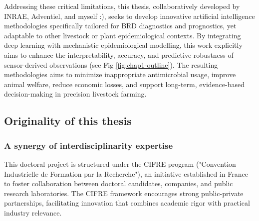 Addressing these critical limitations, this thesis, collaboratively developed by INRAE, Adventiel, and myself :), seeks to develop innovative artificial intelligence methodologies specifically tailored for BRD diagnostics and prognostics, yet adaptable to other livestock or plant epidemiological contexts. By integrating deep learning with mechanistic epidemiological modelling, this work explicitly aims to enhance the interpretability, accuracy, and predictive robustness of sensor-derived observations (see Fig \ref{fig:chap1-outline}). The resulting methodologies aims to minimize inappropriate antimicrobial usage, improve animal welfare, reduce economic losses, and support long-term, evidence-based decision-making in precision livestock farming.




\subsection{Originality of this thesis}

\subsubsection{A synergy of interdisciplinarity expertise}

This doctoral project is structured under the CIFRE program ("Convention Industrielle de Formation par la Recherche"), an initiative established in France to foster collaboration between doctoral candidates, companies, and public research laboratories. The CIFRE framework encourages strong public-private partnerships, facilitating innovation that combines academic rigor with practical industry relevance.

